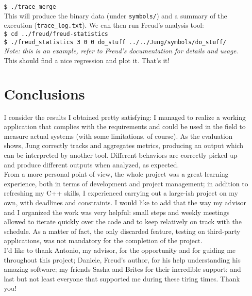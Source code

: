         \texttt{\$ ./trace\_merge}\\

        This will produce the binary data (under \texttt{symbols/}) and a summary of the execution
        (\texttt{trace\_log.txt}).
        We can then run Freud's analysis tool:\\

        \texttt{\$ cd ../freud/freud-statistics}\\

        \texttt{\$ ./freud\_statistics 3 0 0 do\_stuff ../../Jung/symbols/do\_stuff/}\\
        
        \textit{Note: this is an example, refer to Freud's documentation for details and usage.}\\

        This should find a nice regression and plot it. That's it!


\chapter{Conclusions}


    I consider the results I obtained pretty satisfying: I managed to realize a working application
    that complies with the requirements and could be used in the field to measure actual systems
    (with some limitations, of course). As the evaluation shows, Jung correctly tracks and aggregates
    metrics, producing an output which can be interpreted by another tool. Different behaviors are
    correctly picked up and produce different outputs when analyzed, as expected.\\
    
    From a more personal point of view, the whole project was a great learning experience, both
    in terms of development and project management; in addition to refreshing my C++ skills, I
    experienced carrying out a large-ish project on my own, with deadlines and constraints.
    I would like to add that the way my advisor and I organized the work was very helpful: small
    steps and weekly meetings allowed to iterate quickly over the code and to keep 
    relatively on track with the schedule. As a matter of fact, the only discarded feature,
    testing on third-party applications, was not mandatory for the completion of the project.\\

    I'd like to thank Antonio, my advisor, for the opportunity and for guiding me throughout
    this project; Daniele, Freud's author, for his help understanding his amazing software;
    my friends Sasha and Brites for their incredible support;
    and last but not least everyone that supported me during these tiring times. Thank you!


